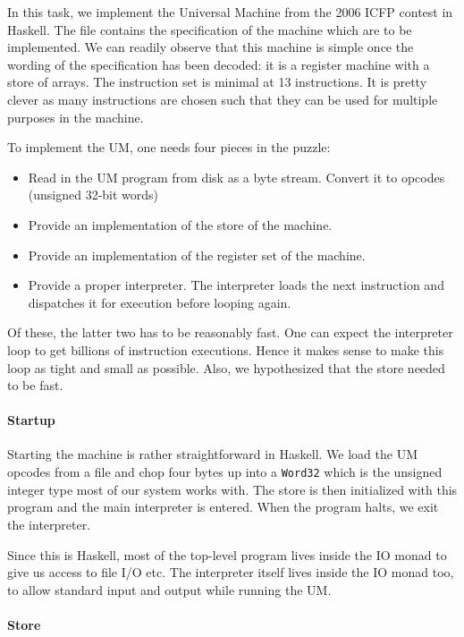 In this task, we implement the Universal Machine from the 2006 ICFP
contest in Haskell. The file \cite{um+spec} contains the specification
of the machine which are to be implemented. We can readily observe
that this machine is simple once the wording of the specification has
been decoded: it is a register machine with a store of
arrays. The instruction set is minimal at 13 instructions. It is pretty
clever as many instructions are chosen such that they can be used for
multiple purposes in the machine.

To implement the UM, one needs four pieces in the puzzle:
\begin{itemize}
\item Read in the UM program from disk as a byte stream. Convert it to
  opcodes (unsigned 32-bit words)
\item Provide an implementation of the store of the machine.
\item Provide an implementation of the register set of the machine.
\item Provide a proper interpreter. The interpreter loads the next
  instruction and dispatches it for execution before looping again.
\end{itemize}
Of these, the latter two has to be reasonably fast. One can expect the
interpreter loop to get billions of instruction executions. Hence it
makes sense to make this loop as tight and small as possible. Also, we
hypothesized that the store needed to be fast.

\paragraph{Startup}
\label{sec:startup}

Starting the machine is rather straightforward in Haskell. We load the
UM opcodes from a file and chop four bytes up into a \texttt{Word32}
which is the unsigned integer type most of our system works with. The
store is then initialized with this program and the main interpreter
is entered. When the program halts, we exit the interpreter.

Since this is Haskell, most of the top-level program lives inside the
IO monad to give us access to file I/O etc. The interpreter itself
lives inside the IO monad too, to allow standard input and output while
running the UM.

\paragraph{Store}
\label{sec:store}

